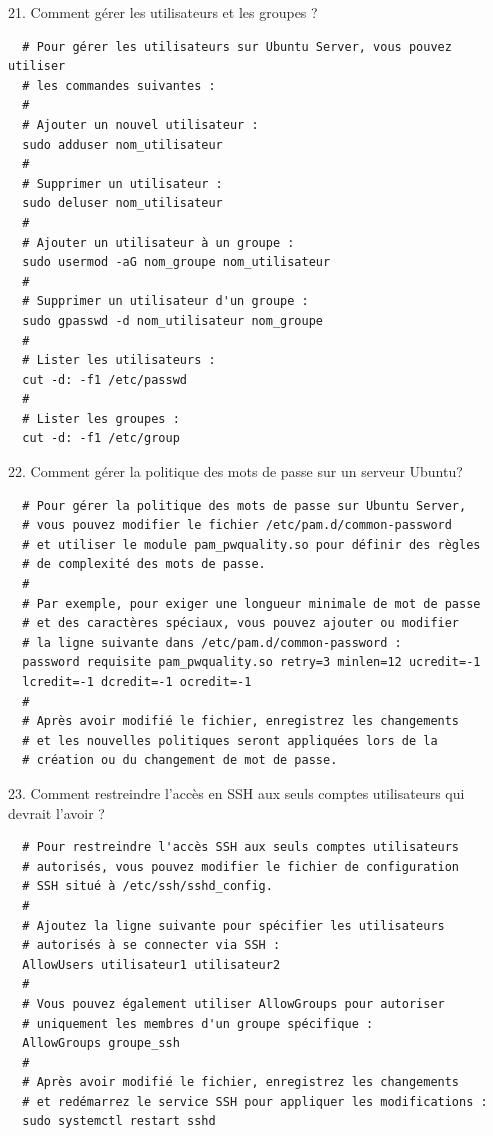 \newpage 

21. Comment gérer les utilisateurs et les groupes ?

\begin{center}
  \begin{verbatim}
  # Pour gérer les utilisateurs sur Ubuntu Server, vous pouvez utiliser
  # les commandes suivantes :
  #
  # Ajouter un nouvel utilisateur :
  sudo adduser nom_utilisateur
  #
  # Supprimer un utilisateur :
  sudo deluser nom_utilisateur
  #
  # Ajouter un utilisateur à un groupe :
  sudo usermod -aG nom_groupe nom_utilisateur
  #
  # Supprimer un utilisateur d'un groupe :
  sudo gpasswd -d nom_utilisateur nom_groupe
  #
  # Lister les utilisateurs :
  cut -d: -f1 /etc/passwd
  #
  # Lister les groupes :
  cut -d: -f1 /etc/group
  \end{verbatim}
\end{center}

\vspace{0.5cm}

22. Comment gérer la politique des mots de passe sur un serveur Ubuntu?

\begin{center}
  \begin{verbatim}
  # Pour gérer la politique des mots de passe sur Ubuntu Server,
  # vous pouvez modifier le fichier /etc/pam.d/common-password
  # et utiliser le module pam_pwquality.so pour définir des règles
  # de complexité des mots de passe.
  #
  # Par exemple, pour exiger une longueur minimale de mot de passe
  # et des caractères spéciaux, vous pouvez ajouter ou modifier
  # la ligne suivante dans /etc/pam.d/common-password :
  password requisite pam_pwquality.so retry=3 minlen=12 ucredit=-1
  lcredit=-1 dcredit=-1 ocredit=-1
  #
  # Après avoir modifié le fichier, enregistrez les changements
  # et les nouvelles politiques seront appliquées lors de la
  # création ou du changement de mot de passe.
  \end{verbatim}
\end{center}

\newpage

23. Comment restreindre l'accès en SSH aux seuls comptes utilisateurs qui devrait l'avoir ?

\begin{center}
  \begin{verbatim}
  # Pour restreindre l'accès SSH aux seuls comptes utilisateurs
  # autorisés, vous pouvez modifier le fichier de configuration
  # SSH situé à /etc/ssh/sshd_config.
  #
  # Ajoutez la ligne suivante pour spécifier les utilisateurs
  # autorisés à se connecter via SSH :
  AllowUsers utilisateur1 utilisateur2
  #
  # Vous pouvez également utiliser AllowGroups pour autoriser
  # uniquement les membres d'un groupe spécifique :
  AllowGroups groupe_ssh
  #
  # Après avoir modifié le fichier, enregistrez les changements
  # et redémarrez le service SSH pour appliquer les modifications :
  sudo systemctl restart sshd
  \end{verbatim}
\end{center}


